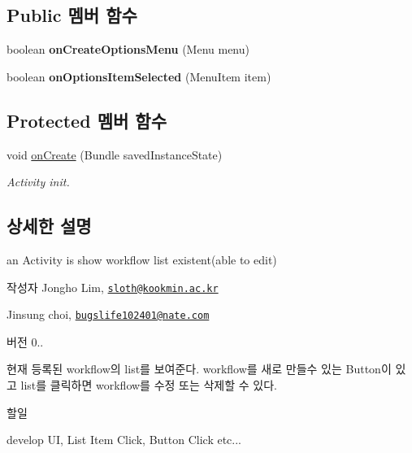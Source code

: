 \subsection*{Public 멤버 함수}
\begin{DoxyCompactItemize}
\item 
\hypertarget{classkookmin_1_1cs_1_1homeflow_1_1_flow_list_activity_aeefaa220dea7d250602e4e1c4dfff848}{}boolean {\bfseries on\+Create\+Options\+Menu} (Menu menu)\label{classkookmin_1_1cs_1_1homeflow_1_1_flow_list_activity_aeefaa220dea7d250602e4e1c4dfff848}

\item 
\hypertarget{classkookmin_1_1cs_1_1homeflow_1_1_flow_list_activity_a7a81313dcc21b5d7abc65d93432a9a99}{}boolean {\bfseries on\+Options\+Item\+Selected} (Menu\+Item item)\label{classkookmin_1_1cs_1_1homeflow_1_1_flow_list_activity_a7a81313dcc21b5d7abc65d93432a9a99}

\end{DoxyCompactItemize}
\subsection*{Protected 멤버 함수}
\begin{DoxyCompactItemize}
\item 
void \hyperlink{classkookmin_1_1cs_1_1homeflow_1_1_flow_list_activity_a8e7f4c315f0498cbb846022ddd0df21e}{on\+Create} (Bundle saved\+Instance\+State)
\begin{DoxyCompactList}\small\item\em Activity init. \end{DoxyCompactList}\end{DoxyCompactItemize}


\subsection{상세한 설명}
an Activity is show workflow list existent(able to edit) 

\begin{DoxyAuthor}{작성자}
Jongho Lim, \href{mailto:sloth@kookmin.ac.kr}{\tt sloth@kookmin.\+ac.\+kr} 

Jinsung choi, \href{mailto:bugslife102401@nate.com}{\tt bugslife102401@nate.\+com} 
\end{DoxyAuthor}
\begin{DoxyVersion}{버전}
0..
\end{DoxyVersion}
현재 등록된 workflow의 list를 보여준다. workflow를 새로 만들수 있는 Button이 있고 list를 클릭하면 workflow를 수정 또는 삭제할 수 있다. \begin{DoxyRefDesc}{할일}
\item[\hyperlink{todo__todo000003}{할일}]develop U\+I, List Item Click, Button Click etc... \end{DoxyRefDesc}


